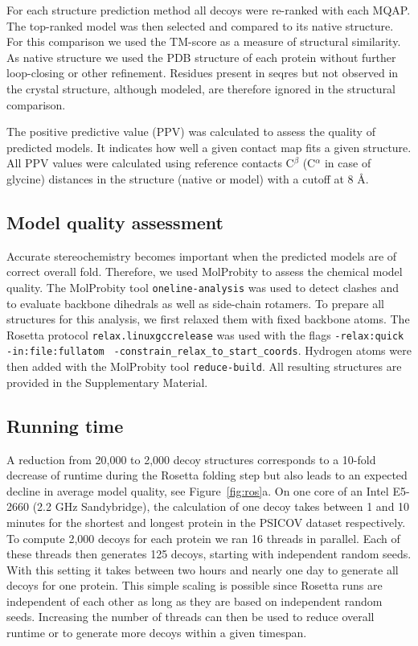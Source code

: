 \documentclass{bioinfo}
\begin{document}
\begin{methods}
For each structure prediction method all decoys were re-ranked with
each MQAP. The top-ranked model was then selected and compared to its
native structure. For this comparison we used the TM-score
\cite[]{zhang_scoring_2004} as a measure of structural similarity. As
native structure we used the PDB structure of each protein without
further loop-closing or other refinement. Residues present in seqres
but not observed in the crystal structure, although modeled, are therefore ignored in the structural
comparison.

The positive predictive value (PPV) was calculated to assess the
quality of predicted models. It indicates how well a given contact map
fits a given structure. All PPV values were calculated using reference
contacts C$^{\beta}$ (C$^{\alpha}$ in case of glycine) distances in
the structure (native or model) with a cutoff at 8 \AA.


\subsection{Model quality assessment}

{\color{red}Accurate stereochemistry becomes important when the predicted models
are of correct overall fold. Therefore,} we used MolProbity \cite[]{chen_molprobity:_2010} to assess the chemical
model quality. The MolProbity tool {\tt oneline-analysis} was used to 
detect clashes and to evaluate backbone dihedrals as well as 
side-chain rotamers. To prepare all structures for this analysis, we 
first relaxed them with fixed backbone atoms.
The Rosetta protocol {\tt relax.linuxgccrelease} was used with the flags 
{\tt -relax:quick} {\tt -in:file:fullatom} {\tt 
-constrain\_relax\_to\_start\_coords}. Hydrogen atoms were then 
added with the MolProbity tool {\tt reduce-build}. All resulting 
structures are provided in the Supplementary Material.



\subsection{Running time}
A reduction from 20,000 to 2,000 decoy structures corresponds to a 10-fold
decrease of runtime during the Rosetta folding step but also leads to an
expected decline in average model quality{\color{red}, see Figure~\ref{fig:ros}a}. On one core of an Intel
E5-2660 (2.2 GHz Sandybridge), the calculation of one decoy takes
between 1 and 10 minutes for the shortest and longest protein in the
PSICOV dataset respectively. To compute 2,000 decoys for each protein
we ran 16 threads in parallel. Each of these threads then generates
125 decoys, starting with independent random seeds. With this setting
it takes between two hours and nearly one day to generate all decoys
for one protein. This simple scaling is possible since Rosetta runs
are independent of each other as long as they are based on 
independent random seeds. Increasing the number of threads can then be used to reduce
overall runtime or to generate more decoys within a given timespan.

\end{methods}
\end{document}
